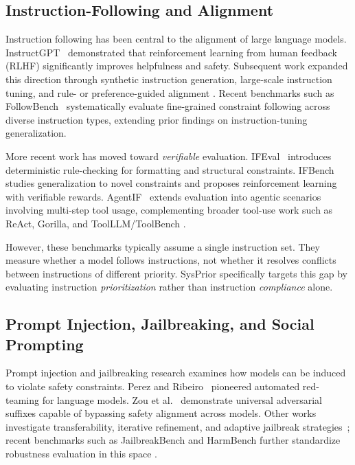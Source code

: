 \documentclass{article}
\newcommand{\ihbench}{SysPrior}
\begin{document}
\subsection{Instruction-Following and Alignment}

Instruction following has been central to the alignment of large language models.
InstructGPT~\cite{ouyang2022instructgpt} demonstrated that reinforcement learning from human feedback (RLHF) significantly improves helpfulness and safety. Subsequent work expanded this direction through synthetic instruction generation, large-scale instruction tuning, and rule- or preference-guided alignment \cite{wang2023selfinstruct,wang2022superni,sanh2022flan,chung2022flant5,bai2022constitutional,glaese2022sparrow}.
Recent benchmarks such as FollowBench~\cite{jiang2024followbench} systematically evaluate fine-grained constraint following across diverse instruction types, extending prior findings on instruction-tuning generalization.

More recent work has moved toward \emph{verifiable} evaluation.
IFEval~\cite{zhou2023ifeval} introduces deterministic rule-checking for formatting and structural constraints.
IFBench~\cite{pyatkin2025ifbench} studies generalization to novel constraints and proposes reinforcement learning with verifiable rewards.
AgentIF~\cite{qi2025agentif} extends evaluation into agentic scenarios involving multi-step tool usage, complementing broader tool-use work such as ReAct, Gorilla, and ToolLLM/ToolBench \cite{yao2023react,patil2023gorilla,qin2023toolllm}.

However, these benchmarks typically assume a single instruction set.
They measure whether a model follows instructions, not whether it resolves conflicts between instructions of different priority.
\ihbench{} specifically targets this gap by evaluating instruction \emph{prioritization} rather than instruction \emph{compliance} alone.

\subsection{Prompt Injection, Jailbreaking, and Social Prompting}

Prompt injection and jailbreaking research examines how models can be induced to violate safety constraints.
Perez and Ribeiro~\cite{perez2022redteaming} pioneered automated red-teaming for language models.
Zou et al.~\cite{zou2023universal} demonstrate universal adversarial suffixes capable of bypassing safety alignment across models.
Other works investigate transferability, iterative refinement, and adaptive jailbreak strategies~\cite{shen2023jailbreak,chao2023pair,andriushchenko2024adaptive}; recent benchmarks such as JailbreakBench and HarmBench further standardize robustness evaluation in this space \cite{chao2024jailbreakbench,mazeika2024harmbench}.
\end{document}
